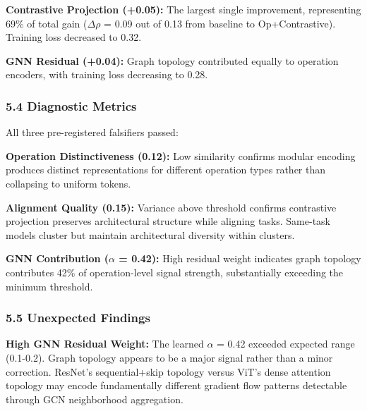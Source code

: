 \textbf{Contrastive Projection (+0.05):} The largest single improvement, representing 69\% of total gain ($\Delta\rho$ = 0.09 out of 0.13 from baseline to Op+Contrastive). Training loss decreased to 0.32.

\textbf{GNN Residual (+0.04):} Graph topology contributed equally to operation encoders, with training loss decreasing to 0.28.

\subsubsection{5.4 Diagnostic Metrics}

All three pre-registered falsifiers passed:

\begin{table}[htbp]
\centering
{}
\end{table}

\textbf{Operation Distinctiveness (0.12):} Low similarity confirms modular encoding produces distinct representations for different operation types rather than collapsing to uniform tokens.

\textbf{Alignment Quality (0.15):} Variance above threshold confirms contrastive projection preserves architectural structure while aligning tasks. Same-task models cluster but maintain architectural diversity within clusters.

\textbf{GNN Contribution ($\alpha$ = 0.42):} High residual weight indicates graph topology contributes 42\% of operation-level signal strength, substantially exceeding the minimum threshold.

\subsubsection{5.5 Unexpected Findings}

\textbf{High GNN Residual Weight:} The learned $\alpha$ = 0.42 exceeded expected range (0.1-0.2). Graph topology appears to be a major signal rather than a minor correction. ResNet's sequential+skip topology versus ViT's dense attention topology may encode fundamentally different gradient flow patterns detectable through GCN neighborhood aggregation.


